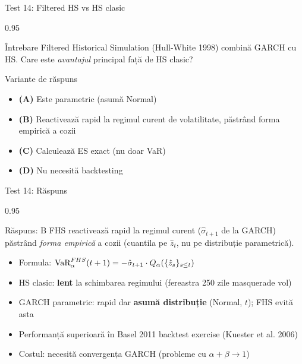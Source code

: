 \documentclass[9pt, aspectratio=169, t]{beamer}
\begin{document}
\begin{frame}[shrink=10]{Test 14: Filtered HS vs HS clasic}
    \begin{cminipage}{0.95\textwidth}
    \begin{alertblock}{Întrebare}
    Filtered Historical Simulation (Hull-White 1998) combină GARCH cu HS. Care este \emph{avantajul} principal față de HS clasic?
    \end{alertblock}
    \begin{block}{Variante de răspuns}
    \begin{itemize}\setlength{\itemsep}{0pt}
        \item \textbf{(A)} Este parametric (asumă Normal)
        \item \textbf{(B)} Reactivează rapid la regimul curent de volatilitate, păstrând forma empirică a cozii
        \item \textbf{(C)} Calculează ES exact (nu doar VaR)
        \item \textbf{(D)} Nu necesită backtesting
    \end{itemize}
    \end{block}
    \end{cminipage}
\end{frame}

\begin{frame}[shrink=10]{Test 14: Răspuns}
    \begin{cminipage}{0.95\textwidth}
    \begin{exampleblock}{Răspuns: B}
    FHS reactivează rapid la regimul curent ($\hat{\sigma}_{t+1}$ de la GARCH) păstrând \emph{forma empirică} a cozii (cuantila pe $\hat{z}_t$, nu pe distribuție parametrică).
    \end{exampleblock}
    \begin{itemize}\setlength{\itemsep}{0pt}
        \item Formula: $\text{VaR}^{FHS}_\alpha(t+1) = -\hat{\sigma}_{t+1} \cdot Q_\alpha(\{\hat{z}_s\}_{s \leq t})$
        \item HS clasic: \textbf{lent} la schimbarea regimului (fereastra 250 zile masquerade vol)
        \item GARCH parametric: rapid dar \textbf{asumă distribuție} (Normal, $t$); FHS evită asta
        \item Performanță superioară în Basel 2011 backtest exercise (Kuester et al. 2006)
        \item Costul: necesită convergența GARCH (probleme cu $\alpha + \beta \to 1$)
    \end{itemize}
    \end{cminipage}
\end{frame}
\end{document}
